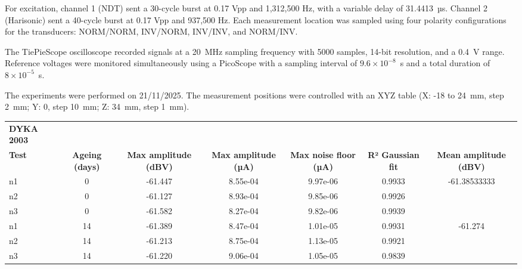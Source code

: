 \documentclass{article}
\begin{document}
For excitation, channel 1 (NDT) sent a 30-cycle burst at 0.17 Vpp and 1,312,500 Hz, with a variable delay of 31.4413~µs. Channel 2 (Harisonic) sent a 40-cycle burst at 0.17 Vpp and 937,500 Hz. Each measurement location was sampled using four polarity configurations for the transducers: NORM/NORM, INV/NORM, INV/INV, and NORM/INV.

The TiePieScope oscilloscope recorded signals at a 20~MHz sampling frequency with 5000 samples, 14-bit resolution, and a 0.4~V range. Reference voltages were monitored simultaneously using a PicoScope with a sampling interval of $9.6 \times 10^{-8}$~s and a total duration of $8 \times 10^{-5}$~s.

The experiments were performed on 21/11/2025. The measurement positions were controlled with an XYZ table (X: -18 to 24~mm, step 2~mm; Y: 0, step 10~mm; Z: 34~mm, step 1~mm).




\begin{table}[h!]
\centering
\begin{tabular}{l c c c c c c}
\hline
\textbf{DYKA 2003} & & & & & & \\
\textbf{Test} & \textbf{Ageing (days)} & \textbf{Max amplitude (dBV)} &
\textbf{Max amplitude (µA)} & \textbf{Max noise floor (µA)} &
\textbf{R² Gaussian fit} & \textbf{Mean amplitude (dBV)} \\
\hline
n1 & 0  & -61.447 & 8.55e-04 & 9.97e-06 & 0.9933 & \multirow{3}{*}{-61.38533333} \\
n2 & 0  & -61.127 & 8.93e-04 & 9.85e-06 & 0.9926 & \\
n3 & 0  & -61.582 & 8.27e-04 & 9.82e-06 & 0.9939 & \\
\hline
n1 & 14 & -61.389 & 8.47e-04 & 1.01e-05 & 0.9931 & \multirow{3}{*}{-61.274} \\
n2 & 14 & -61.213 & 8.75e-04 & 1.13e-05 & 0.9921 & \\
n3 & 14 & -61.220 & 9.06e-04 & 1.05e-05 & 0.9839 & \\
\hline
\end{tabular}
\end{table}
\end{document}
